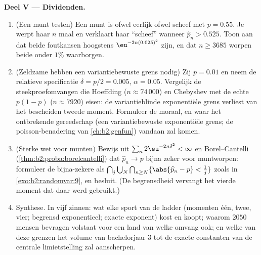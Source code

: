 \begin{problem}
\medskip
\noindent\textbf{Deel V --- Dividenden.}
\begin{enumerate}[resume]
  \item (Een munt testen) Een munt is ofwel eerlijk ofwel scheef
        met $p = 0.55$. Je werpt haar $n$ maal en verklaart haar
        ``scheef'' wanneer $\widehat p_n > 0.525$. Toon aan dat
        beide foutkansen hoogstens $\eu^{-2n(0.025)^2}$ zijn, en
        dat $n \geq 3685$ worpen beide onder $1\%$ waarborgen.
  \item (Zeldzame  hebben een variantiebewuste grens
        nodig) Zij $p = 0.01$ en neem de relatieve specificatie
        $\delta = p/2 = 0.005$, $\alpha = 0.05$. Vergelijk de
        steekproefomvangen die Hoeffding ($n \approx 74\,000$) en
        Chebyshev met de echte  $p(1-p)$ ($n \approx
        7920$) eisen: de variantieblinde exponentiële grens verliest
        van het bescheiden tweede moment. Formuleer de moraal, en
        waar het ontbrekende gereedschap (een variantiebewuste
        exponentiële grens; de poisson-benadering van
        \cref{ch:b2:genfun}) vandaan zal komen.
  \item (Sterke wet voor munten) Bewijs uit $\sum_n
        2\eu^{-2n\delta^2} < \infty$ en Borel--Cantelli
        (\cref{thm:b2:proba:borelcantelli}) dat $\widehat p_n \to
        p$ bijna zeker voor  muntworpen: formuleer de
        bijna-zekere  als
        $\bigcap_j\bigcup_N\bigcap_{n\geq N} \{\abs{\widehat p_n -
        p} < \tfrac1j\}$ zoals in \cref{exo:b2:randomvar:9}, en
        besluit. (De begrensdheid vervangt het vierde moment dat
        daar werd gebruikt.)
  \item Synthese. In vijf zinnen: wat elke sport van de ladder
        (momenten één, twee, vier; begrensd exponentieel; exacte
        exponent) kost en koopt; waarom $2050$ mensen bevragen
        volstaat voor een land van welke omvang ook; en welke van
        deze grenzen het volume van bachelorjaar 3 tot de exacte
        constanten van de centrale limietstelling zal aanscherpen.
\end{enumerate}
\end{problem}
